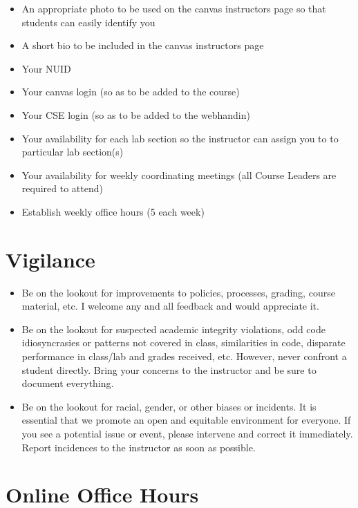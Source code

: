 \documentclass[12pt]{scrartcl}
\begin{document}
\begin{itemize}
  \item An appropriate photo to be used on the canvas instructors 
    page so that students can easily identify you
  \item A short bio to be included in the canvas instructors page 
  \item Your NUID
  \item Your canvas login (so as to be added to the course)
  \item Your CSE login (so as to be added to the webhandin)
  \item Your availability for each lab section so the instructor can 
    assign you to to particular lab section(s) 
  \item Your availability for weekly coordinating meetings (all Course 
    Leaders are required to attend)
  \item Establish weekly office hours (5 each week)
\end{itemize}

\section*{Vigilance}

\begin{itemize}
  \item Be on the lookout for improvements to policies, processes, 
    grading, course material, etc.  I welcome any and all feedback and would
    appreciate it.
  \item Be on the lookout for suspected academic integrity violations, odd
    code idiosyncrasies or patterns not covered in class, similarities in code, 
    disparate performance in class/lab and grades received, etc.  However,
    never confront a student directly.  Bring your concerns to the instructor and
    be sure to document everything.
  \item Be on the lookout for racial, gender, or other biases or incidents.  
    It is essential that we promote an open and equitable environment for everyone.
    If you see a potential issue or event, please intervene and correct it immediately.
    Report incidences to the instructor as soon as possible.  
\end{itemize}

\section*{Online Office Hours}
\end{document}
